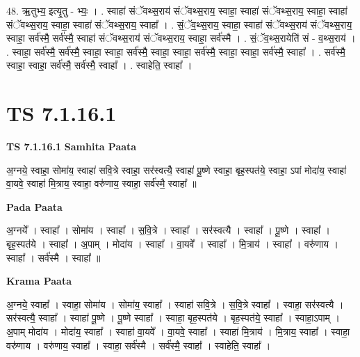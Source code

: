 \documentclass[17pt]{extarticle}
\begin{document}
48. ऋ॒तुभ्य॒ इत्यृ॒तु - भ्यः॒ । . स्वाहा॑ संॅवथ्स॒राय॑ संॅवथ्स॒राय॒ स्वाहा॒ स्वाहा॑ संॅवथ्स॒राय॒ स्वाहा॒ स्वाहा॑ संॅवथ्स॒राय॒ स्वाहा॒ स्वाहा॑ संॅवथ्स॒राय॒ स्वाहा᳚ । . सं॒ॅव॒थ्स॒राय॒ स्वाहा॒ स्वाहा॑ संॅवथ्स॒राय॑ संॅवथ्स॒राय॒ स्वाहा॒ सर्व॑स्मै॒ सर्व॑स्मै॒ स्वाहा॑ संॅवथ्स॒राय॑ संॅवथ्स॒राय॒ स्वाहा॒ सर्व॑स्मै । . सं॒ॅव॒थ्स॒रायेति॑ सं - व॒थ्स॒राय॑ । . स्वाहा॒ सर्व॑स्मै॒ सर्व॑स्मै॒ स्वाहा॒ स्वाहा॒ सर्व॑स्मै॒ स्वाहा॒ स्वाहा॒ सर्व॑स्मै॒ स्वाहा॒ स्वाहा॒ सर्व॑स्मै॒ स्वाहा᳚ । . सर्व॑स्मै॒ स्वाहा॒ स्वाहा॒ सर्व॑स्मै॒ सर्व॑स्मै॒ स्वाहा᳚ । . स्वाहेति॒ स्वाहा᳚ । \newline
\pagebreak
{}

\section{ TS 7.1.16.1 }

\textbf{TS 7.1.16.1 } \newline
\textbf{Samhita Paata} \newline

अ॒ग्नये॒ स्वाहा॒ सोमा॑य॒ स्वाहा॑ सवि॒त्रे स्वाहा॒ सर॑स्वत्यै॒ स्वाहा॑ पू॒ष्णे स्वाहा॒ बृह॒स्पत॑ये॒ स्वाहा॒ ऽपां मोदा॑य॒ स्वाहा॑ वा॒यवे॒ स्वाहा॑ मि॒त्राय॒ स्वाहा॒ वरु॑णाय॒ स्वाहा॒ सर्व॑स्मै॒ स्वाहा᳚ ॥ \newline

\textbf{Pada Paata} \newline

अ॒ग्नये᳚ । स्वाहा᳚ । सोमा॑य । स्वाहा᳚ । स॒वि॒त्रे । स्वाहा᳚ । सर॑स्वत्यै । स्वाहा᳚ । पू॒ष्णे । स्वाहा᳚ । बृह॒स्पत॑ये । स्वाहा᳚ । अ॒पाम् । मोदा॑य । स्वाहा᳚ । वा॒यवे᳚ । स्वाहा᳚ । मि॒त्राय॑ । स्वाहा᳚ । वरु॑णाय । स्वाहा᳚ । सर्व॑स्मै । स्वाहा᳚ ॥  \newline


\textbf{Krama Paata} \newline

अ॒ग्नये॒ स्वाहा᳚ । स्वाहा॒ सोमा॑य । सोमा॑य॒ स्वाहा᳚ । स्वाहा॑ सवि॒त्रे । स॒वि॒त्रे स्वाहा᳚ । स्वाहा॒ सर॑स्वत्यै । सर॑स्वत्यै॒ स्वाहा᳚ । स्वाहा॑ पू॒ष्णे । पू॒ष्णे स्वाहा᳚ । स्वाहा॒ बृह॒स्पत॑ये । बृह॒स्पत॑ये॒ स्वाहा᳚ । स्वाहा॒ऽपाम् । अ॒पाम् मोदा॑य । मोदा॑य॒ स्वाहा᳚ । स्वाहा॑ वा॒यवे᳚ । वा॒यवे॒ स्वाहा᳚ । स्वाहा॑ मि॒त्राय॑ । मि॒त्राय॒ स्वाहा᳚ । स्वाहा॒ वरु॑णाय । वरु॑णाय॒ स्वाहा᳚ । स्वाहा॒ सर्व॑स्मै । सर्व॑स्मै॒ स्वाहा᳚ । स्वाहेति॒ स्वाहा᳚ । \newline
\end{document}
